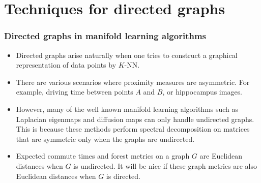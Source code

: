 \documentclass[professionalfonts, hyperref={pdfpagelabels=false,
  colorlinks=true, linkcolor=purple}]{beamer}
\begin{document}
\section{Techniques for directed graphs}
\begin{frame}
  \frametitle{Directed graphs in manifold learning algorithms}
  \begin{itemize}
  \item Directed graphs arise naturally when one tries to construct
    a graphical representation of data points by $K$-NN.
  \item There are various scenarios where proximity measures are
    asymmetric. For example, driving time between points $A$ and $B$,
    or hippocampus images. 
  \item However, many of the well known manifold learning
    algorithms such as Laplacian eigenmaps and diffusion maps can only
    handle undirected graphs. This is because these methods perform
    spectral decomposition on matrices that are symmetric only
    when the graphs are undirected.
  \item Expected commute times and forest metrics on a graph $G$
    are Euclidean distances when $G$ is undirected. It will be nice if
    these graph metrics are also Euclidean distances when $G$ is
    directed. 
  \end{itemize}
\end{frame}
\end{document}
